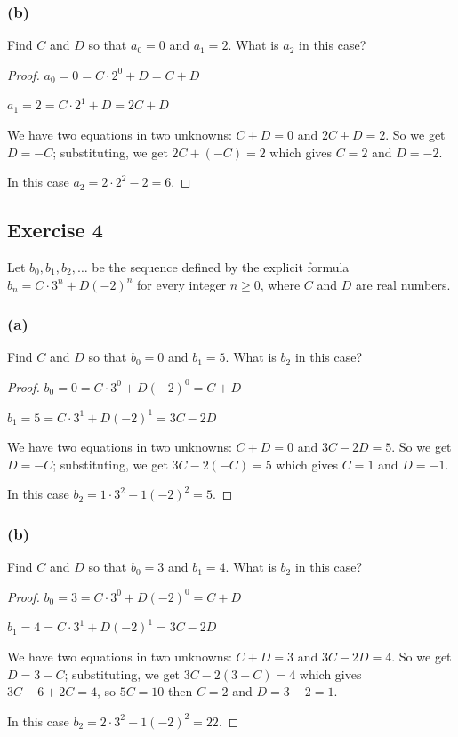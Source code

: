 \documentclass[14pt]{extarticle}
\begin{document}
\subsubsection{(b)}
Find $C$ and $D$ so that \(a_0 = 0\) and \(a_1 = 2\). What is $a_2$ in this case?

\begin{proof}
\(a_0 = 0 = C \cdot 2^0 + D = C + D\)

\(a_1 = 2 = C \cdot 2^1 + D = 2C + D\)

We have two equations in two unknowns: \(C+D = 0\) and \(2C+D = 2\). So we get $D = -C$; substituting, we get
\(2C + (-C) = 2\) which gives $C = 2$ and $D = -2$.

In this case \(a_2 = 2 \cdot 2^2 - 2 = 6\).
\end{proof}

\subsection{Exercise 4}
Let \(b_0, b_1, b_2, \ldots\) be the sequence defined by the explicit formula \(b_n = C \cdot 3^n + D(-2)^n\) for 
every integer \(n \geq 0\), where $C$ and $D$ are real numbers.

\subsubsection{(a)}
Find $C$ and $D$ so that \(b_0 = 0\) and \(b_1 = 5\). What is $b_2$ in this case?

\begin{proof}
\(b_0 = 0 = C \cdot 3^0 + D(-2)^0 = C + D\)

\(b_1 = 5 = C \cdot 3^1 + D(-2)^1 = 3C - 2D\)

We have two equations in two unknowns: \(C+D = 0\) and \(3C-2D = 5\). So we get $D = -C$; substituting, we get
\(3C -2(-C) = 5\) which gives $C = 1$ and $D = -1$.

In this case \(b_2 = 1 \cdot 3^2 - 1(-2)^2 = 5\).
\end{proof}

\subsubsection{(b)}
Find $C$ and $D$ so that \(b_0 = 3\) and \(b_1 = 4\). What is $b_2$ in this case?

\begin{proof}
\(b_0 = 3 = C \cdot 3^0 + D(-2)^0 = C + D\)

\(b_1 = 4 = C \cdot 3^1 + D(-2)^1 = 3C - 2D\)

We have two equations in two unknowns: \(C+D = 3\) and \(3C-2D = 4\). So we get $D = 3-C$; substituting, we get
\(3C -2(3-C) = 4\) which gives \(3C - 6 + 2C = 4\), so $5C = 10$ then $C = 2$ and $D = 3-2 = 1$.

In this case \(b_2 = 2 \cdot 3^2 + 1(-2)^2 = 22\).
\end{proof}
\end{document}
